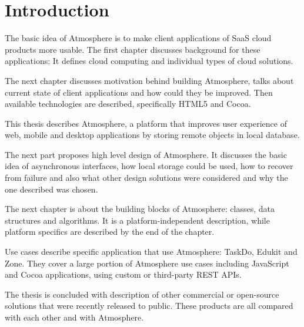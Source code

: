 \setcounter{page}{1}
\setcounter{equation}{0}
\setcounter{figure}{0}
\setcounter{table}{0}

\section*{Introduction}

The basic idea of Atmosphere is to make client applications of SaaS cloud products more usable. The first chapter discusses background for these applications: It defines cloud computing and individual types of cloud solutions.

The next chapter discusses motivation behind building Atmosphere, talks about current state of client applications and how could they be improved. Then available technologies are described, specifically HTML5 and Cocoa.

This thesis describes Atmosphere, a platform that improves user experience of web, mobile and desktop applications by storing remote objects in local database.

The next part proposes high level design of Atmosphere. It discusses the basic idea of asynchronous interfaces, how local storage could be used, how to recover from failure and also what other design solutions were considered and why the one described was chosen.

The next chapter is about the building blocks of Atmosphere: classes, data structures and algorithms. It is a platform-independent description, while platform specifics are described by the end of the chapter.

Use cases describe specific application that use Atmosphere: TaskDo, Edukit and Zone. They cover a large portion of Atmosphere use cases including JavaScript and Cocoa applications, using custom or third-party REST APIs.

The thesis is concluded with description of other commercial or open-source solutions that were recently released to public. These products are all compared with each other and with Atmosphere. 